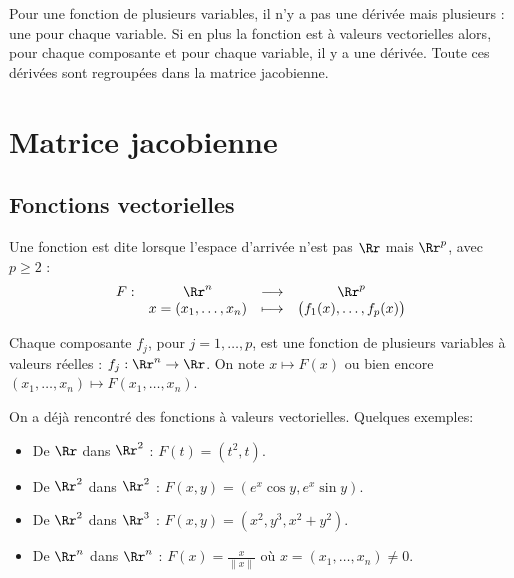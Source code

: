 \documentclass[11pt, class=report,crop=false]{standalone}
\begin{document}


\newcommand{\grad}{\operatorname{grad}} %
\newcommand{\diver}{\operatorname{div}}
\newcommand{\rot}{\operatorname{rot}}


Pour une fonction de plusieurs variables, il n'y a pas une dérivée mais plusieurs : une pour chaque variable. Si en plus la fonction est à valeurs vectorielles alors, pour chaque composante et pour chaque variable, il y a une dérivée. Toute ces dérivées sont regroupées dans la matrice jacobienne.

\section{Matrice jacobienne}

\subsection{Fonctions vectorielles}


Une fonction est dite  lorsque l'espace d'arrivée n'est pas $\Rr$ mais $\Rr^p$, avec $p\ge2$ :
$$\begin{array}{cccc}
F : & \Rr^n & \longrightarrow & \Rr^p \\
    & x=(x_1,\ldots,x_n) & \longmapsto & \big( f_1(x), \ldots, f_p(x) \big) \\
\end{array}$$
    
Chaque composante $f_j$, pour $j=1,\ldots,p$, est une fonction de plusieurs variables à valeurs réelles : $f_j : \Rr^n \to \Rr$. On note  $x \mapsto F(x)$ ou bien encore $(x_1,\ldots,x_n) \mapsto F(x_1,\ldots,x_n)$.


On a déjà rencontré des fonctions à valeurs vectorielles. Quelques exemples:
\begin{itemize}
\item De $\Rr$ dans $\Rr^2$ : $F(t) = (t^2,t)$.
\item De $\Rr^2$ dans $\Rr^2$ : $F(x,y) = (e^x \cos y , e^x \sin y)$.
\item De $\Rr^2$ dans $\Rr^3$ : $F(x,y) = (x^2,y^3, x^2 + y^2)$.
\item De $\Rr^n$ dans $\Rr^n$ : $F(x) = \displaystyle \frac{x}{\|x\|}$ où $x = (x_1,\ldots,x_n) \neq 0$.
\end{itemize}
\end{document}
